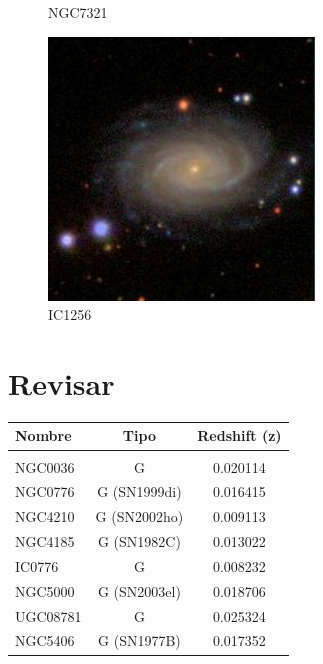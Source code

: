 \documentclass[9pt]{revtex4-1}
\begin{document}
\begin{figure}[h]
\caption{NGC7321}
\includegraphics[scale=0.3]{IC1256.png}
\caption{IC1256}
\end{figure}

\section{Revisar}

\begin{center}
\begin{tabular}{ l c c }
Nombre & Tipo & Redshift (z) \\
\hline
\hline \\
NGC0036 & G & 0.020114 \\
NGC0776 & G (SN1999di) & 0.016415 \\
NGC4210 & G (SN2002ho) & 0.009113 \\
NGC4185 & G (SN1982C)  & 0.013022 \\
IC0776  & G & 0.008232 \\
NGC5000 & G (SN2003el) & 0.018706 \\
UGC08781 & G & 0.025324 \\
NGC5406 & G (SN1977B) & 0.017352

\end{tabular}
\end{center}
\end{document}
